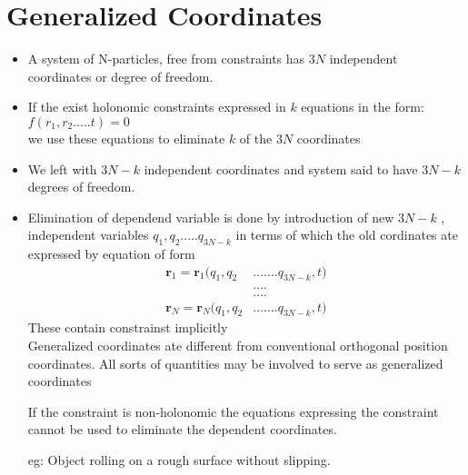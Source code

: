 \section{Generalized Coordinates}
\begin{itemize}
	\item A system of N-particles, free from constraints has $3N$ independent coordinates or degree of freedom. 
	\item If the exist holonomic constraints expressed in $k$ equations in the form:\\
	$f(r_1,r_2.....t)=0$\\
	we use these equations to eliminate $k$ of the $3N$ coordinates
	\item We left with $3N-k$ independent coordinates and system said to have $3N-k$ degrees of freedom.
	\item Elimination of dependend variable is done by introduction of new $3N-k$ , independent variables $q_1,q_2.....q_{3N-k}$ in terms of which the old cordinates ate expressed by equation of form
\begin{align*}
	\textbf{r}_1=\textbf{r}_1(q_1,q_2&.......q_{3N-k}, t)\\
	&....\\
	&....\\
	\textbf{r}_N=\textbf{r}_N(q_1,q_2&.......q_{3N-k}, t)
\end{align*}
	These contain constrainst implicitly\\
	Generalized coordinates ate different from conventional orthogonal position coordinates. All sorts of quantities  may be involved to serve as generalized coordinates
	\begin{note}
		If the constraint is non-holonomic the equations expressing the constraint cannot be used to eliminate the dependent coordinates.
	\end{note}
	eg: Object rolling on a rough surface without slipping.
\end{itemize}

